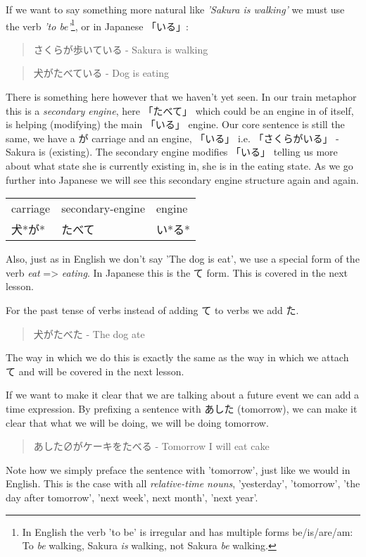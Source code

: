 \documentclass[11pt]{article}
\begin{document}
If we want to say something more natural like \emph{'Sakura is walking'} we must use the verb \emph{'to be'}\footnote{In English the verb 'to be' is irregular and has multiple forms be/is/are/am: To \emph{be} walking, Sakura \emph{is} walking, not Sakura \emph{be} walking.}, or in Japanese 「いる」:
\begin{quote}
さくらが歩いている - Sakura is walking
\end{quote}
\begin{quote}
犬がたべている - Dog is eating
\end{quote}
There is something here however that we haven't yet seen. In our train metaphor this is a \emph{secondary engine}, here 「たべて」 which could be an engine in of itself, is helping (modifying) the main 「いる」 engine. Our core sentence is still the same, we have a が carriage and an engine, 「いる」 i.e. 「さくらがいる」 - Sakura is (existing). The secondary engine modifies 「いる」 telling us more about what state she is currently existing in, she is in the eating state. As we go further into Japanese we will see this secondary engine structure again and again.
\begin{center}
\begin{tabular}{lll}
carriage & secondary-engine & engine\\
犬*が* & たべて & い*る*\\
\end{tabular}
\end{center}

Also, just as in English we don't say 'The dog is eat', we use a special form of the verb \emph{eat} => \emph{eating}. In Japanese this is the て form. This is covered in the next lesson.

For the past tense of verbs instead of adding て to verbs we add た.
\begin{quote}
犬がたべた - The dog ate
\end{quote}
The way in which we do this is exactly the same as the way in which we attach て and will be covered in the next lesson.

If we want to make it clear that we are talking about a future event we can add a time expression. By prefixing a sentence with あした (tomorrow), we can make it clear that what we will be doing, we will be doing tomorrow.
\begin{quote}
あした∅がケーキをたべる - Tomorrow I will eat cake
\end{quote}
Note how we simply preface the sentence with 'tomorrow', just like we would in English. This is the case with all \emph{relative-time nouns}, 'yesterday', 'tomorrow', 'the day after tomorrow', 'next week', next month', 'next year'.
\end{document}
